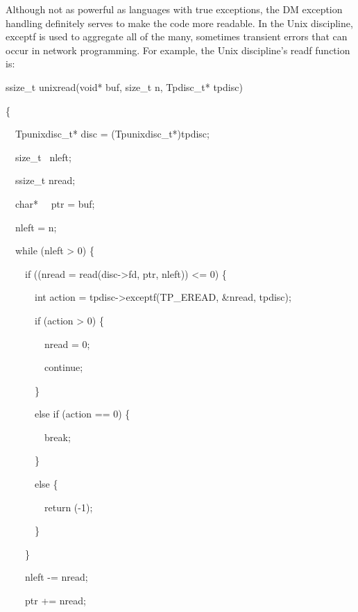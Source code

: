 Although not as powerful as languages with true exceptions, the DM
exception handling definitely serves to make the code more
readable. In the Unix discipline, exceptf is used to aggregate all of
the many, sometimes transient errors that can occur in network
programming. For example, the Unix discipline's readf function is:

{\ttfamily\mdseries
ssize\_t unixread(void* buf, size\_t n, Tpdisc\_t* tpdisc)}

{\ttfamily\mdseries
\{}

{\ttfamily\mdseries
\ \ Tpunixdisc\_t* disc = (Tpunixdisc\_t*)tpdisc;}


\bigskip

{\ttfamily\mdseries
\ \ size\_t \ nleft;}

{\ttfamily\mdseries
\ \ ssize\_t nread;}

{\ttfamily\mdseries
\ \ char* \ \ ptr = buf;}


\bigskip

{\ttfamily\mdseries
\ \ nleft = n;}

{\ttfamily\mdseries
\ \ while (nleft {\textgreater} 0) \{}

{\ttfamily\mdseries
\ \ \ \ if ((nread = read(disc-{\textgreater}fd, ptr, nleft)) {\textless}= 0) \{}

{\ttfamily\mdseries
\ \ \ \ \ \ int action = tpdisc-{\textgreater}exceptf(TP\_EREAD, \&nread, tpdisc);}

{\ttfamily\mdseries
\ \ \ \ \ \ if (action {\textgreater} 0) \{}

{\ttfamily\mdseries
\ \ \ \ \ \ \ \ nread = 0;}

{\ttfamily\mdseries
\ \ \ \ \ \ \ \ continue;}

{\ttfamily\mdseries
\ \ \ \ \ \ \}}

{\ttfamily\mdseries
\ \ \ \ \ \ else if (action == 0) \{}

{\ttfamily\mdseries
\ \ \ \ \ \ \ \ break;}

{\ttfamily\mdseries
\ \ \ \ \ \ \}}

{\ttfamily\mdseries
\ \ \ \ \ \ else \{}

{\ttfamily\mdseries
\ \ \ \ \ \ \ \ return (-1);}

{\ttfamily\mdseries
\ \ \ \ \ \ \}}

{\ttfamily\mdseries
\ \ \ \ \}}


\bigskip

{\ttfamily\mdseries
\ \ \ \ nleft -= nread;}

{\ttfamily\mdseries
\ \ \ \ ptr += nread;}


